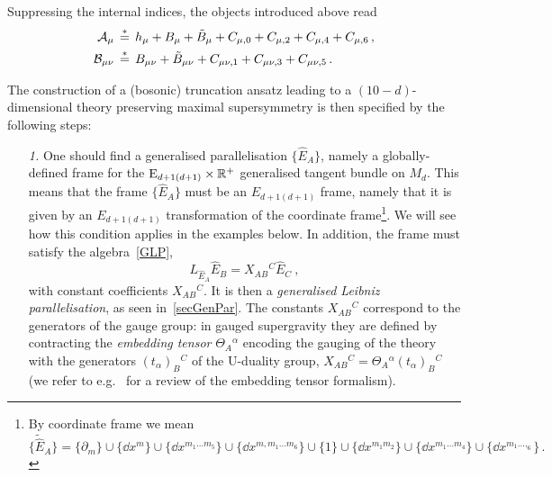 \documentclass[debug]{phd}
\begin{document}
			Suppressing the internal indices, the objects introduced above read
					\begin{equation}
						\begin{split}
							\mathcal{A}_\mu \,&\stackrel{*}{=}\, h_\mu + B_{\mu} + \tilde B_{\mu} + C_{\mu,0}+ C_{\mu,2}+ C_{\mu ,4} + C_{\mu,6} \, , \\
							\mathcal{B}_{\mu\nu} \,&\stackrel{*}{=}\, B_{\mu\nu} + \tilde{B}_{\mu\nu} + C_{\mu\nu,1}+ C_{\mu\nu ,3} + C_{\mu\nu,5} \, .
						\end{split}
					\end{equation}
			
			The construction of a (bosonic) truncation ansatz leading to a $(10-d)$-dimensional theory preserving maximal supersymmetry is then specified by the following steps:
					\begin{itemize}
					\item[\textit{1.}] 	One should find a generalised parallelisation $\{\hat E_A\}$, namely a globally-defined frame for the $\mathrm{E}_{d+1(d+1)}\times \mathbb{R}^+$ generalised tangent bundle on $M_d$.
									This means that the frame $\{\hat E_A\}$ must be an $E_{d+1(d+1)}$ frame, namely that it is given by an $E_{d+1(d+1)}$ transformation of the coordinate frame\footnote{%
										By coordinate frame we mean
												\begin{equation*}
													\{ \tilde{\hat{E}}_A\} = \{\partial_m\} \cup \{\dd x^m\} \cup \{\dd x^{m_1 \ldots m_5} \} \cup \{\dd x^{m,m_1\ldots m_6}\} \cup \{1\} \cup \{\dd x^{m_1m_2}\} \cup \{\dd x^{m_1\ldots m_4}\} \cup \{\dd x^{m_1 \ldots ,_6}\} \, . 
 												\end{equation*}
										}.
									We will see how this condition applies in the examples below. 
									In addition, the frame must satisfy the algebra~\eqref{GLP},
											\begin{equation}\label{LeibnizParall}
												L_{\hat E_A}\hat E_B = X_{AB}{}^C \hat E_C\ ,
											\end{equation}
									with constant coefficients $X_{AB}{}^C$. 
									It is then a \emph{generalised Leibniz parallelisation}, as seen in~\cref{secGenPar}. 
									The constants $X_{AB}{}^C$ correspond to the generators of the gauge group: in gauged supergravity they are defined by contracting the \emph{embedding tensor} $\Theta_A{}^\alpha$ encoding the gauging of the theory with the generators $(t_\alpha)_B{}^C$ of the U-duality group, $X_{AB}{}^C = \Theta_A{}^\alpha (t_\alpha)_B{}^C$ (we refer to e.g.~\cite{henlect} for a review of the embedding tensor formalism). 

\end{itemize}
\end{document}
